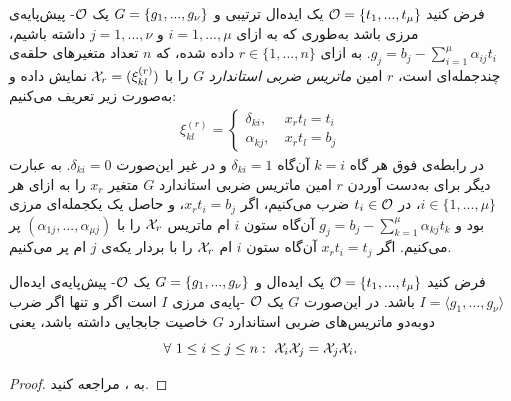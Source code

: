 \begin{definition}
فرض کنید 
${\mathcal O} = \{t_{1},...,t_{\mu}\}$
یک ایده‌ال ترتیبی و 
$G = \{g_{1},...,g_{\nu}\}$
یک 
${\mathcal O}$-
پیش‌پایه‌ی مرزی باشد به‌طوری که به ازای 
$i = 1,...,\mu$
و
$j = 1,...,\nu$
داشته باشیم، 
$g_{j} = b_{j} - \sum_{i = 1}^{\mu}\alpha_{ij}t_{i}$.
به ازای 
$r\in\{1,...,n\}$
داده شده، که 
$n$
تعداد متغیر‌های حلقه‌ی چندجمله‌ای است،
$r$
امین 
\textit{ماتریس ضربی استاندارد}
$G$
را با 
${\mathcal X}_{r} = (\xi_{kl}^{(r)})$
نمایش داده و به‌صورت زیر تعریف می‌کنیم:
\begin{align*}
\xi_{kl}^{(r)} = \left\{
 \begin{array}{lr}
\delta_{ki}, & \ x_{r}t_{l} = t_{i}\\
\alpha_{kj}, & \ x_{r}t_{l} = b_{j}
\end{array}\right.
\end{align*}
در رابطه‌ی فوق هر گاه 
$k = i$
آن‌گاه 
$\delta_{ki} = 1$
و در غیر این‌صورت 
$\delta_{ki} = 0$.
 به عبارت دیگر برای به‌دست  آوردن 
 $r$
 امین ماتریس ضربی استاندارد 
 $G$
متغیر 
$x_{r}$
را به ازای هر 
$i\in\{1,...,\mu\}$،
در 
$t_{i}\in {\mathcal O}$
ضرب می‌کنیم، اگر 
$x_{r}t_{i} = b_{j}$،
و حاصل یک یکجمله‌ای مرزی بود و 
$g_{j} = b_{j} - \sum_{k = 1}^{\mu}\alpha_{kj}t_{k}$
آن‌گاه ستون 
$i$
ام ماتریس 
${\mathcal X}_{r}$
را با 
$(\alpha_{1j},...,\alpha_{\mu j})$
پر می‌کنیم. اگر 
$x_{r}t_{i} = t_{j}$
آن‌گاه ستون 
$i$
ام 
${\mathcal X}_{r}$
را با بردار یکه‌ی 
$j$
ام پر می‌کنیم.
\end{definition}

\begin{theorem}
	\label{murrain th}
فرض کنید 
${\mathcal O} = \{t_{1},...,t_{\mu}\}$
یک ایده‌ال و 
$G = \{g_{1},...,g_{\nu}\}$
یک 
${\mathcal O}$-
پیش‌پایه‌ی ایده‌ال 
$I = \langle g_{1},...,g_{\nu} \rangle$
باشد. در این‌صورت 
$G$
یک 
${\mathcal O}$
-پایه‌ی مرزی 
$I$
است اگر و تنها اگر ضرب دوبه‌دو  ماتریس‌های ضربی استاندارد 
$G$
خاصیت جابجایی داشته باشد، یعنی
$$\forall \ 1\leq i\leq j\leq n: \ {\mathcal X}_{i}{\mathcal X}_{j} = {\mathcal X}_{j}{\mathcal X}_{i}.$$
\end{theorem}
\begin{proof}
به
\cite[ص.۴۳۴]{cca2_kreuzer}
، مراجعه کنید.
\end{proof}

